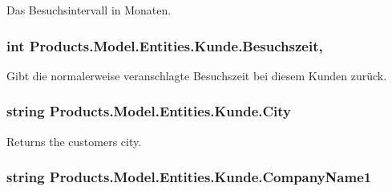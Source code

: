 Das Besuchsintervall in Monaten. 

\subsubsection[{\texorpdfstring{Besuchszeit}{Besuchszeit}}]{\setlength{\rightskip}{0pt plus 5cm}int Products.\+Model.\+Entities.\+Kunde.\+Besuchszeit\hspace{0.3cm}{\ttfamily [get]}, {\ttfamily [set]}}\hypertarget{class_products_1_1_model_1_1_entities_1_1_kunde_a84483e77b49dae74d087dac0d4dd27c4}{}\label{class_products_1_1_model_1_1_entities_1_1_kunde_a84483e77b49dae74d087dac0d4dd27c4}


Gibt die normalerweise veranschlagte Besuchszeit bei diesem Kunden zurück. 

\subsubsection[{\texorpdfstring{City}{City}}]{\setlength{\rightskip}{0pt plus 5cm}string Products.\+Model.\+Entities.\+Kunde.\+City\hspace{0.3cm}{\ttfamily [get]}}\hypertarget{class_products_1_1_model_1_1_entities_1_1_kunde_a18c3d169d6fc639d6d45a53c8b3ce43c}{}\label{class_products_1_1_model_1_1_entities_1_1_kunde_a18c3d169d6fc639d6d45a53c8b3ce43c}


Returns the customer\textquotesingle{}s city. 

\subsubsection[{\texorpdfstring{Company\+Name1}{CompanyName1}}]{\setlength{\rightskip}{0pt plus 5cm}string Products.\+Model.\+Entities.\+Kunde.\+Company\+Name1\hspace{0.3cm}{\ttfamily [get]}}\hypertarget{class_products_1_1_model_1_1_entities_1_1_kunde_aa3f47ecfa4306b77f41e4708050f244c}{}\label{class_products_1_1_model_1_1_entities_1_1_kunde_aa3f47ecfa4306b77f41e4708050f244c}


